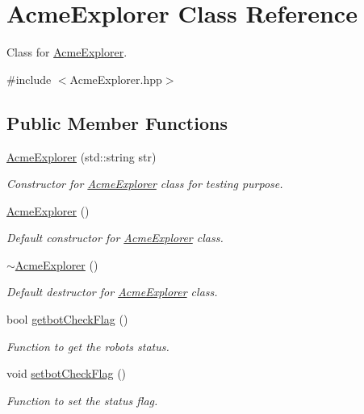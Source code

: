 \hypertarget{classAcmeExplorer}{}\section{Acme\+Explorer Class Reference}
\label{classAcmeExplorer}


Class for \hyperlink{classAcmeExplorer}{Acme\+Explorer}.  




{\ttfamily \#include $<$Acme\+Explorer.\+hpp$>$}

\subsection*{Public Member Functions}
\begin{DoxyCompactItemize}
\item 
\hyperlink{classAcmeExplorer_a4950df7ad00bc30ff060b2e3d54528f2}{Acme\+Explorer} (std\+::string str)
\begin{DoxyCompactList}\small\item\em Constructor for \hyperlink{classAcmeExplorer}{Acme\+Explorer} class for testing purpose. \end{DoxyCompactList}\item 
\hyperlink{classAcmeExplorer_aad1290ed2c9de9fb484c2db5eeae1922}{Acme\+Explorer} ()
\begin{DoxyCompactList}\small\item\em Default constructor for \hyperlink{classAcmeExplorer}{Acme\+Explorer} class. \end{DoxyCompactList}\item 
\hyperlink{classAcmeExplorer_acf0225d7eec16b41209ffceda8f89674}{$\sim$\+Acme\+Explorer} ()
\begin{DoxyCompactList}\small\item\em Default destructor for \hyperlink{classAcmeExplorer}{Acme\+Explorer} class. \end{DoxyCompactList}\item 
bool \hyperlink{classAcmeExplorer_a2e72e7896bcc90d31495b3f217d7d669}{getbot\+Check\+Flag} ()
\begin{DoxyCompactList}\small\item\em Function to get the robot\textquotesingle{}s status. \end{DoxyCompactList}\item 
void \hyperlink{classAcmeExplorer_a34651796b3ebb90c939fff12239cca7f}{setbot\+Check\+Flag} ()
\begin{DoxyCompactList}\small\item\em Function to set the status flag. \end{DoxyCompactList}\end{DoxyCompactItemize}


